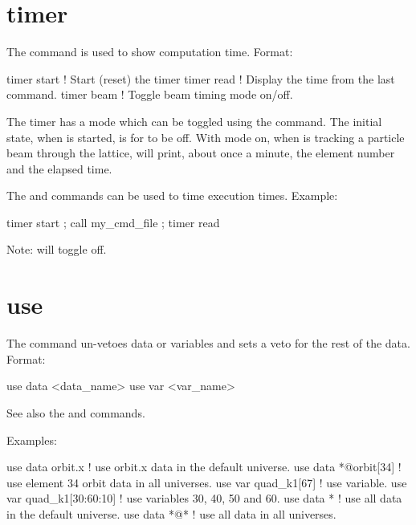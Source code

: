 {{{{{{{{{{{{%

\section{timer}
\label{s:timer}

The  command is used to show computation time. Format:
\begin{example}
  timer start      ! Start (reset) the timer
  timer read       ! Display the time from the last  command.    
  timer beam       ! Toggle beam timing mode on/off.
\end{example}
The timer has a  mode which can be toggled using the  command. The
initial state, when \tao is started, is for  to be off. With  mode
on, when \tao is tracking a particle beam through the lattice, \tao will print, about once a minute,
the element number and the elapsed time.

The  and  commands can be used to time execution
times. Example:
\begin{example}
  timer start ; call my_cmd_file ; timer read
\end{example}

Note:  will toggle  off.

\section{use}
\label{s:use}

The  command un-vetoes data or variables and sets a veto for the rest of the
data. Format:
\begin{example}
  use data  <data_name>
  use var <var_name>
\end{example}

\vskip 7pt 

See also the  and  commands.

Examples:
\begin{example}
  use data orbit.x             ! use orbit.x data in the default universe.
  use data *@orbit[34]         ! use element 34 orbit data in all universes.
  use var quad_k1[67]          ! use variable.
  use var quad_k1[30:60:10]    ! use variables 30, 40, 50 and 60.
  use data *                   ! use all data in the default universe.
  use data *@*                 ! use all data in all universes.
\end{example}

}}}}}}}}}}}}
